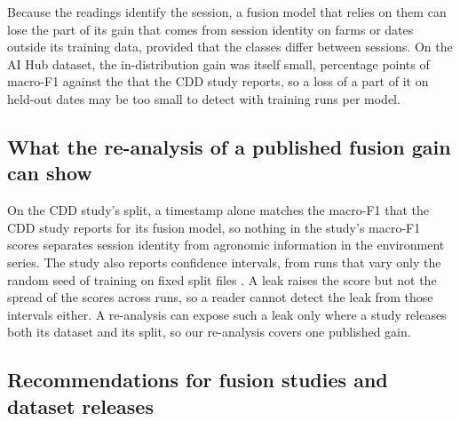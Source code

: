 \documentclass[preprint,12pt,authoryear,nopreprintline]{elsarticle}
\begin{document}
Because the readings identify the session, a fusion model that relies on them can
lose the part of its gain that comes from session identity on farms or dates outside
its training data, provided that the classes differ between sessions. On the AI Hub
dataset, the in-distribution gain was itself small, \iidDeltaPoints{} percentage
points of macro-F1 against the \paperIncrement{} that the CDD study reports, so a loss
of a part of it on held-out dates may be too small to detect with \fusionSeeds{}
training runs per model.

\subsection{What the re-analysis of a published fusion gain can show}

On the CDD study's split, a timestamp alone matches the macro-F1 that the CDD study
\citep{appliedsci2024dacon} reports for its fusion model, so nothing in the study's macro-F1
scores separates session identity from agronomic information in the environment series.
The study also reports confidence intervals, from runs that vary only the random seed
of training on fixed split files \citep{appliedsci2024dacon}. A
leak raises the score but not the spread of the scores across runs, so a reader cannot
detect the leak from those intervals either. A re-analysis can expose such a leak only where a study releases
both its dataset and its split, so our re-analysis covers one published gain.

\subsection{Recommendations for fusion studies and dataset releases}
\end{document}
